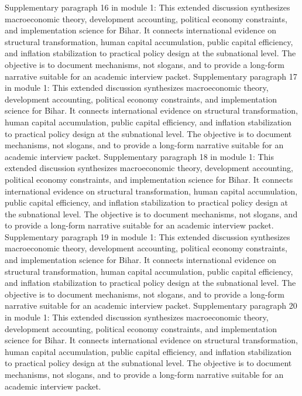 \documentclass[preprint,12pt]{elsarticle}
\begin{document}
Supplementary paragraph 16 in module 1: This extended discussion synthesizes macroeconomic theory, development accounting, political economy constraints, and implementation science for Bihar. It connects international evidence on structural transformation, human capital accumulation, public capital efficiency, and inflation stabilization to practical policy design at the subnational level. The objective is to document mechanisms, not slogans, and to provide a long-form narrative suitable for an academic interview packet.
Supplementary paragraph 17 in module 1: This extended discussion synthesizes macroeconomic theory, development accounting, political economy constraints, and implementation science for Bihar. It connects international evidence on structural transformation, human capital accumulation, public capital efficiency, and inflation stabilization to practical policy design at the subnational level. The objective is to document mechanisms, not slogans, and to provide a long-form narrative suitable for an academic interview packet.
Supplementary paragraph 18 in module 1: This extended discussion synthesizes macroeconomic theory, development accounting, political economy constraints, and implementation science for Bihar. It connects international evidence on structural transformation, human capital accumulation, public capital efficiency, and inflation stabilization to practical policy design at the subnational level. The objective is to document mechanisms, not slogans, and to provide a long-form narrative suitable for an academic interview packet.
Supplementary paragraph 19 in module 1: This extended discussion synthesizes macroeconomic theory, development accounting, political economy constraints, and implementation science for Bihar. It connects international evidence on structural transformation, human capital accumulation, public capital efficiency, and inflation stabilization to practical policy design at the subnational level. The objective is to document mechanisms, not slogans, and to provide a long-form narrative suitable for an academic interview packet.
Supplementary paragraph 20 in module 1: This extended discussion synthesizes macroeconomic theory, development accounting, political economy constraints, and implementation science for Bihar. It connects international evidence on structural transformation, human capital accumulation, public capital efficiency, and inflation stabilization to practical policy design at the subnational level. The objective is to document mechanisms, not slogans, and to provide a long-form narrative suitable for an academic interview packet.
\end{document}
